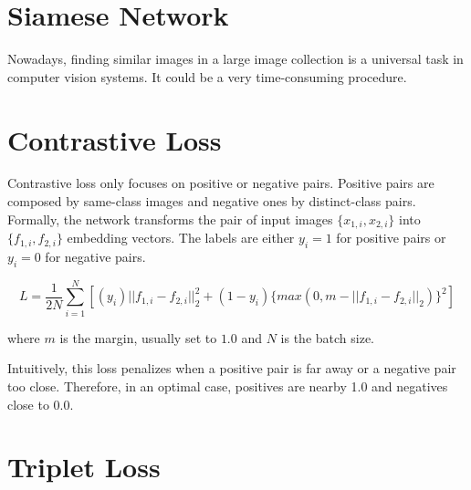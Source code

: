 \section{Siamese Network}

Nowadays, finding similar images in a large image collection is a universal task in computer vision systems. It could be a very time-consuming procedure. 

\section{Contrastive Loss}
Contrastive loss only focuses on positive or negative pairs. Positive pairs are composed by same-class images and negative ones by distinct-class pairs. Formally, the network transforms the pair of input images $\{x_{1,i}, x_{2,i}\}$ into $\{f_{1,i}, f_{2,i}\}$ embedding vectors. The labels are either $y_i = 1$ for positive pairs or $y_i = 0$ for negative pairs.

\begin{equation}
L = \frac{1}{2N}\sum_{i=1}^{N}[(y_i) || f_{1,i} - f_{2,i} ||_2^2 + (1 - y_i)\{ max(0, m - ||f_{1,i} - f_{2,i}||_2) \} ^2]
\end{equation}

where $m$ is the margin, usually set to $1.0$ and $N$ is the batch size.

Intuitively, this loss penalizes when a positive pair is far away or a negative pair too close. Therefore, in an optimal case, positives are nearby 1.0 and negatives close to 0.0.

\section{Triplet Loss}


